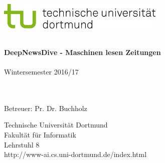 \makeatletter
	\begin{titlepage}
	\vspace*{-2cm}
	\newlength{\links}
	\setlength{\links}{-1.5cm}
	\sffamily
	\hspace*{\links}
	\begin{minipage}{12.5cm}
	\includegraphics[width=8cm]{grafiken/tud_logo_rgb}
	\end{minipage}
	
	\vspace*{4cm}
	
	\hspace*{\links}
	\hspace*{-0.2cm}
	\begin{minipage}{9cm}
	\large
	\begin{center}
	{\Large \@title} \\
	\vspace*{1cm}
	\textbf{DeepNewsDive - Maschinen lesen Zeitungen} \\
	\vspace*{1cm}
	\@author\\
	\vspace*{1cm}
	Wintersemester 2016/17
	\end{center}
	
	~\\
	~\\
	
		
	Betreuer: 
		Pr. Dr. Buchholz
	
	
	\end{minipage}
	\normalsize
	\vspace*{5.5cm}
	
	
	\vspace*{2.1cm}
	
	\hspace*{\links}
	\begin{minipage}[b]{5cm}
	\raggedright
	\end{minipage}
	
	\vspace*{0.5cm}
	\hspace*{\links}
	\begin{minipage}[b]{8cm}
	\raggedright
	Technische Universität Dortmund \\
	Fakultät für Informatik\\
	Lehrstuhl 8\\
	http://www-ai.cs.uni-dortmund.de/index.html
	\end{minipage}
	
	\end{titlepage}
\makeatother